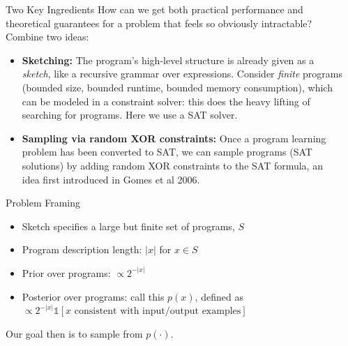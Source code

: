 \documentclass[final]{beamer}
\newlength{\sepwid}
\newlength{\onecolwid}
\begin{document}
\begin{frame}[t]
\begin{columns}[t]
\begin{column}{\onecolwid}

\begin{block}{Two Key Ingredients}
  How can we get both practical  performance and theoretical guarantees for a problem that feels so obviously intractable? Combine two ideas:
  \begin{itemize}
  \item \textbf{Sketching:} The program's high-level structure is
    already given as a \emph{sketch}, like a recursive grammar over
    expressions. Consider \emph{finite} programs (bounded size, bounded
    runtime, bounded memory consumption), which can be modeled in a
    constraint solver: this does the heavy lifting of searching for programs. Here we use a SAT solver.
  \item \textbf{Sampling via random XOR constraints:} Once a program learning problem has been converted to SAT,
    we can sample programs (SAT solutions) by adding random XOR constraints to the SAT formula,
    an idea first introduced in Gomes et al 2006.
  \end{itemize}
\end{block}


\begin{block}{Problem Framing}
  \begin{itemize}
  \item Sketch specifies a large but finite set of programs, $S$
  \item Program description length: $\lvert x \rvert$ for $x\in S$
  \item Prior over programs: $\propto 2^{- \lvert x \rvert }$
  \item Posterior over programs: call this $p(x)$, defined as $\propto 2^{- \lvert x \rvert } \mathds{1}[x \text{ consistent with input/output examples}]$
  \end{itemize}
  Our goal then  is to sample from $p(\cdot)$.
\end{block}


\end{column} %

\begin{column}{\sepwid}\end{column} %


\end{columns}
\end{frame}
\end{document}
